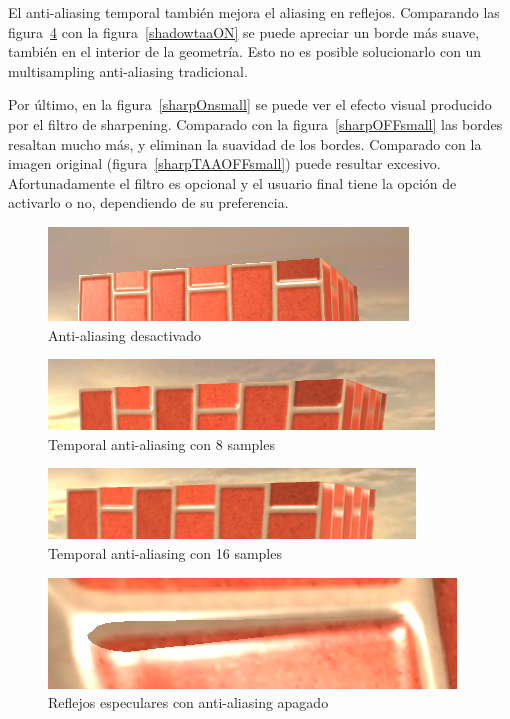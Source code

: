 \documentclass[withindex, glossary]{cam-thesis}
\begin{document}
El anti-aliasing temporal también mejora el aliasing en reflejos. Comparando las figura~\ref{shadowtaaOFF} con la figura~\ref{shadowtaaON} se puede apreciar un borde más suave, también en el interior de la geometría. Esto no es posible solucionarlo con un multisampling anti-aliasing tradicional.

Por último, en la figura~\ref{sharpOnsmall} se puede ver el efecto visual producido por el filtro de sharpening. Comparado con la figura~\ref{sharpOFFsmall} las bordes resaltan mucho más, y eliminan la suavidad de los bordes. Comparado con la imagen original (figura~\ref{sharpTAAOFFsmall}) puede resultar excesivo. Afortunadamente el filtro es opcional y el usuario final tiene la opción de activarlo o no, dependiendo de su preferencia.

\begin{figure}[!htbp]
    \includegraphics[width=.8\linewidth]{figures/taaoff.png}
    \caption{Anti-aliasing desactivado\label{aaoff}}
\end{figure}

\begin{figure}[!htbp]
    \includegraphics[width=.8\linewidth]{figures/taa8.png}
    \caption{Temporal anti-aliasing con 8 samples\label{taa8}}
\end{figure}

\begin{figure}[!htbp]
    \includegraphics[width=.8\linewidth]{figures/taa16.png}
    \caption{Temporal anti-aliasing con 16 samples\label{taa16}}
\end{figure}

\begin{figure}[!htbp]
    \includegraphics[width=.8\linewidth]{figures/shadowtaaOFF.png}
    \caption{Reflejos especulares con anti-aliasing apagado\label{shadowtaaOFF}}
\end{figure}
\end{document}
